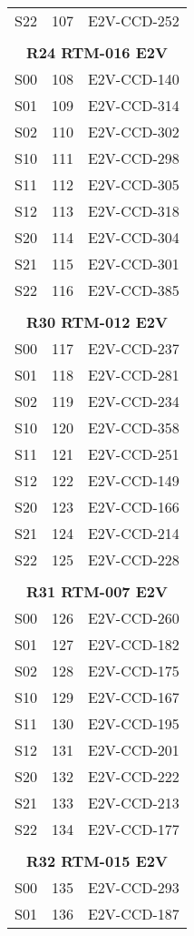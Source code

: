 \begin{longtable}{ccc}
  S22 & 107 & E2V-CCD-252 \\
 & & \\
\multicolumn{3}{c}{\bf R24  RTM-016  E2V} \\
\hline
  S00 & 108 & E2V-CCD-140 \\
  S01 & 109 & E2V-CCD-314 \\
  S02 & 110 & E2V-CCD-302 \\
  S10 & 111 & E2V-CCD-298 \\
  S11 & 112 & E2V-CCD-305 \\
  S12 & 113 & E2V-CCD-318 \\
  S20 & 114 & E2V-CCD-304 \\
  S21 & 115 & E2V-CCD-301 \\
  S22 & 116 & E2V-CCD-385 \\
 & & \\
\multicolumn{3}{c}{\bf R30  RTM-012  E2V} \\
\hline
  S00 & 117 & E2V-CCD-237 \\
  S01 & 118 & E2V-CCD-281 \\
  S02 & 119 & E2V-CCD-234 \\
  S10 & 120 & E2V-CCD-358 \\
  S11 & 121 & E2V-CCD-251 \\
  S12 & 122 & E2V-CCD-149 \\
  S20 & 123 & E2V-CCD-166 \\
  S21 & 124 & E2V-CCD-214 \\
  S22 & 125 & E2V-CCD-228 \\
 & & \\
\multicolumn{3}{c}{\bf R31  RTM-007  E2V} \\
\hline
  S00 & 126 & E2V-CCD-260 \\
  S01 & 127 & E2V-CCD-182 \\
  S02 & 128 & E2V-CCD-175 \\
  S10 & 129 & E2V-CCD-167 \\
  S11 & 130 & E2V-CCD-195 \\
  S12 & 131 & E2V-CCD-201 \\
  S20 & 132 & E2V-CCD-222 \\
  S21 & 133 & E2V-CCD-213 \\
  S22 & 134 & E2V-CCD-177 \\
 & & \\
\multicolumn{3}{c}{\bf R32  RTM-015  E2V} \\
\hline
  S00 & 135 & E2V-CCD-293 \\
  S01 & 136 & E2V-CCD-187 \\

\end{longtable}
